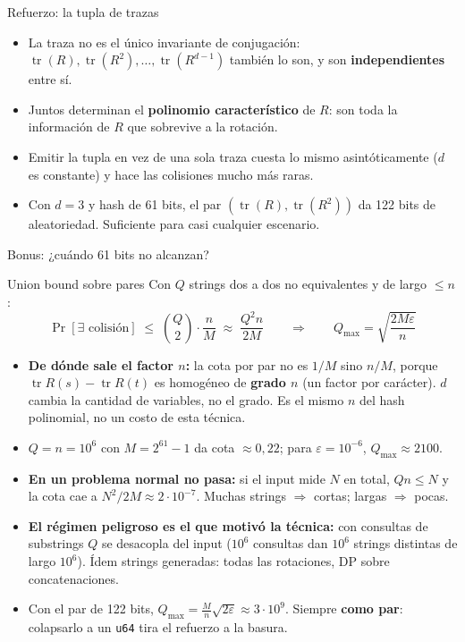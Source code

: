 \documentclass{beamer}
\begin{document}
\begin{frame}{Refuerzo: la tupla de trazas}
\begin{itemize}
    \item La traza no es el único invariante de conjugación: $\operatorname{tr}(R), \operatorname{tr}(R^2), \dots, \operatorname{tr}(R^{d-1})$ también lo son, y son \textbf{independientes} entre sí.
    \item Juntos determinan el \textbf{polinomio característico} de $R$: son toda la información de $R$ que sobrevive a la rotación.
    \item Emitir la tupla en vez de una sola traza cuesta lo mismo asintóticamente ($d$ es constante) y hace las colisiones mucho más raras.
    \item Con $d=3$ y hash de 61 bits, el par $(\operatorname{tr}(R), \operatorname{tr}(R^2))$ da 122 bits de aleatoriedad. Suficiente para casi cualquier escenario.
\end{itemize}
\end{frame}

\begin{frame}{Bonus: ¿cuándo 61 bits no alcanzan?}
\footnotesize
\begin{block}{Union bound sobre pares}
Con $Q$ strings dos a dos no equivalentes y de largo $\le n$:
\[
\Pr[\exists \text{ colisión}] \;\le\; \binom{Q}{2}\cdot\frac{n}{M} \;\approx\; \frac{Q^2 n}{2M}
\qquad\Longrightarrow\qquad Q_{\max} = \sqrt{\frac{2M\varepsilon}{n}}
\]
\end{block}
\begin{itemize}
    \item \textbf{De dónde sale el factor $n$:} la cota por par no es $1/M$ sino $n/M$, porque $\operatorname{tr} R(s) - \operatorname{tr} R(t)$ es homogéneo de \textbf{grado $n$} (un factor por carácter). $d$ cambia la cantidad de variables, no el grado. Es el mismo $n$ del hash polinomial, no un costo de esta técnica.
    \item $Q = n = 10^6$ con $M = 2^{61}-1$ da cota $\approx 0{,}22$; para $\varepsilon = 10^{-6}$, $Q_{\max} \approx 2100$.
    \item \textbf{En un problema normal no pasa:} si el input mide $N$ en total, $Qn \le N$ y la cota cae a $N^2/2M \approx 2\cdot10^{-7}$. Muchas strings $\Rightarrow$ cortas; largas $\Rightarrow$ pocas.
    \item \textbf{El régimen peligroso es el que motivó la técnica:} con consultas de substrings $Q$ se desacopla del input ($10^6$ consultas dan $10^6$ strings distintas de largo $10^6$). Ídem strings generadas: todas las rotaciones, DP sobre concatenaciones.
    \item Con el par de 122 bits, $Q_{\max} = \frac{M}{n}\sqrt{2\varepsilon} \approx 3\cdot10^9$. Siempre \textbf{como par}: colapsarlo a un \texttt{u64} tira el refuerzo a la basura.
\end{itemize}
\end{frame}
\end{document}
